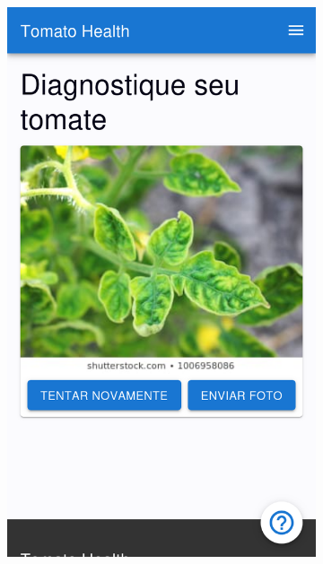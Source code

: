 \begin{figure}[htp]
\begin{subfigure}{0.3\textwidth}
        \includegraphics[width=\linewidth, height=0.4\textheight, keepaspectratio]{images/diagnostic4.png}
    \end{subfigure}
    \begin{subfigure}{0.3\textwidth}
        \centering

\end{subfigure}
\end{figure}

